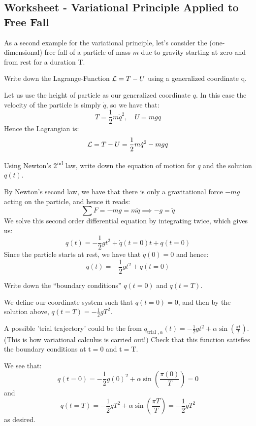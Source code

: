 \subsection{Worksheet - Variational Principle Applied to Free Fall}
As a second example for the variational principle, let’s consider the (one-dimensional) free fall of a particle of mass $m$ due to gravity starting at zero and from rest for a duration T.

\begin{p}
Write down the Lagrange-Function $\mathcal{L} = T - U$ using a generalized coordinate q.
\end{p}
\begin{s}
Let us use the height of particle as our generalized coordinate $q$. In this case the velocity of the particle is simply $\dot{q}$, so we have that:
\[T = \frac{1}{2}m\dot{q}^2, \quad U = mgq\]
Hence the Lagrangian is:
\[\mathcal{L} = T - U = \frac{1}{2}m\dot{q}^2 - mgq\]
\end{s}

\begin{p}
Using Newton’s 2\textsuperscript{nd} law, write down the equation of motion for $q$ and the solution $q(t)$.
\end{p}
\begin{s}
By Newton's second law, we have that there is only a gravitational force $-mg$ acting on the particle, and hence it reads:
\[\sum F = -mg = m\ddot{q} \implies -g = \ddot{q}\]
We solve this second order differential equation by integrating twice, which gives us:
\[q(t) = -\frac{1}{2}gt^2 + \dot{q}(t=0)t + q(t=0)\]
Since the particle starts at rest, we have that $\dot{q}(0) = 0$ and hence:
\[q(t) = -\frac{1}{2}gt^2 + q(t=0)\]
\end{s}

\begin{p}
Write down the “boundary conditions” $q(t=0)$ and $q(t=T)$.
\end{p}
\begin{s}
We define our coordinate system such that $q(t=0) = 0$, and then by the solution above, $q(t=T) = -\frac{1}{2}gT^2$.
\end{s}

\begin{p}
A possible 'trial trajectory' could be the from $q_{\text {trial }, \alpha}(t)=-\frac{1}{2} g t^{2}+\alpha \sin \left(\frac{\pi t}{T}\right)$. (This is how variational calculus is carried out!) Check that this function satisfies the boundary conditions at $\mathrm{t}=0$ and $\mathrm{t}=\mathrm{T}$.
\end{p}
\begin{s}
We see that:
\[q(t=0) = -\frac{1}{2}g(0)^2 + \alpha \sin \left(\frac{\pi (0)}{T}\right) = 0\]
and
\[q(t=T) = -\frac{1}{2}gT^2 + \alpha \sin \left(\frac{\pi T}{T}\right) = -\frac{1}{2}gT^2 \]
as desired.
\end{s}

